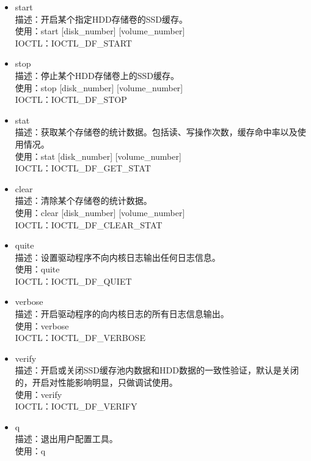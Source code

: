 \begin{itemize}
\item start
\\描述：开启某个指定HDD存储卷的SSD缓存。
\\使用：start  [disk\_number]  [volume\_number]
\\IOCTL：IOCTL\_DF\_START

\item stop
\\描述：停止某个HDD存储卷上的SSD缓存。
\\使用：stop  [disk\_number]  [volume\_number]
\\IOCTL：IOCTL\_DF\_STOP

\item stat
\\描述：获取某个存储卷的统计数据。包括读、写操作次数，缓存命中率以及使用情况。
\\使用：stat  [disk\_number]  [volume\_number]
\\IOCTL：IOCTL\_DF\_GET\_STAT

\item clear
\\描述：清除某个存储卷的统计数据。
\\使用：clear  [disk\_number]  [volume\_number]
\\IOCTL：IOCTL\_DF\_CLEAR\_STAT

\item quite
\\描述：设置驱动程序不向内核日志输出任何日志信息。
\\使用：quite
\\IOCTL：IOCTL\_DF\_QUIET

\item verbose
\\描述：开启驱动程序的向内核日志的所有日志信息输出。
\\使用：verbose
\\IOCTL：IOCTL\_DF\_VERBOSE

\item verify
\\描述：开启或关闭SSD缓存池内数据和HDD数据的一致性验证，默认是关闭的，开启对性能影响明显，只做调试使用。
\\使用：verify
\\IOCTL：IOCTL\_DF\_VERIFY

\item q
\\描述：退出用户配置工具。
\\使用：q
\end{itemize}

